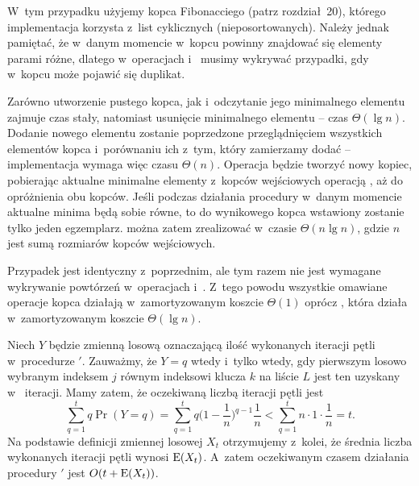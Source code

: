 \subproblem %
W~tym przypadku użyjemy kopca Fibonacciego (patrz rozdział~20), którego implementacja korzysta z~list cyklicznych (nieposortowanych). Należy jednak pamiętać, że w~danym momencie w~kopcu powinny znajdować się elementy parami różne, dlatego w~operacjach  i~ musimy wykrywać przypadki, gdy w~kopcu może pojawić się duplikat.

Zarówno utworzenie pustego kopca, jak i~odczytanie jego minimalnego elementu zajmuje czas stały, natomiast usunięcie minimalnego elementu -- czas $\Theta(\lg n)$. Dodanie nowego elementu zostanie poprzedzone przeglądnięciem wszystkich elementów kopca i~porównaniu ich z~tym, który zamierzamy dodać -- implementacja  wymaga więc czasu $\Theta(n)$. Operacja  będzie tworzyć nowy kopiec, pobierając aktualne minimalne elementy z~kopców wejściowych operacją , aż do opróżnienia obu kopców. Jeśli podczas działania procedury w~danym momencie aktualne minima będą sobie równe, to do wynikowego kopca wstawiony zostanie tylko jeden egzemplarz.  można zatem zrealizować w~czasie $\Theta(n\lg n)$, gdzie $n$ jest sumą rozmiarów kopców wejściowych.

\subproblem %
Przypadek jest identyczny z~poprzednim, ale tym razem nie jest wymagane wykrywanie powtórzeń w~operacjach  i~. Z~tego powodu wszystkie omawiane operacje kopca działają w~zamortyzowanym koszcie $\Theta(1)$ oprócz , która działa w~zamortyzowanym koszcie $\Theta(\lg n)$.


\subproblem %

\subproblem %
Niech $Y$ będzie zmienną losową oznaczającą ilość wykonanych iteracji pętli  w~procedurze $'$. Zauważmy, że $Y=q$ wtedy i~tylko wtedy, gdy pierwszym losowo wybranym indeksem $j$ równym indeksowi klucza $k$ na liście $L$ jest ten uzyskany w~ iteracji. Mamy zatem, że oczekiwaną liczbą iteracji pętli  jest
\[
	\sum_{q=1}^tq\Pr(Y=q) = \sum_{q=1}^tq\biggl(1-\frac{1}{n}\biggr)^{q-1}\frac{1}{n} < \sum_{q=1}^tn\cdot1\cdot\frac{1}{n} = t.
\]
Na podstawie definicji zmiennej losowej $X_t$ otrzymujemy z~kolei, że średnia liczba wykonanych iteracji pętli  wynosi $\operatorname{E}(X_t)$. A~zatem oczekiwanym czasem działania procedury $'$ jest $O(t+\operatorname{E}(X_t))$.

